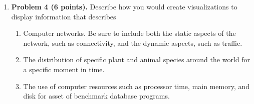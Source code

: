\documentclass{article}%
\newenvironment{proof}[1][Proof]{\textbf{#1.} }{\ \rule{0.5em}{0.5em}}
\begin{document}
\begin{enumerate}
\begin{proof}
\begin{enumerate}
\item \textbf{Triangle Inequality.} \\
$ D(A,C) \leq D(A,B) + D(B,C) $ for all set $A,B,$ and $C$. \\
By De Morgan, $D(A,B) = size(A-B) + size(B-A) = size(A) + size(B) - 2size(A \bigcap B) $ \\
 $D(B,C) = size(B-C) + size(C-B) = size(B) + size(C) - 2size(B \bigcap C) $ \\
 $D(A,C) = size(A-C) + size(C-A) = size(A) + size(C) - 2size(A \bigcap C) $.\\
 $D(A,B) + D(B,C) - D(A,C)=size(A) + size(B) - 2size(A \bigcap B) + size(B) + size(C) - 2size(B \bigcap C)  - size(A) - size(C) + 2size(A \bigcap C)  $ \\
 $\Rightarrow D(A,B) + D(B,C) - D(A,C)= 2size(B) - 2size(A \bigcap B) - 2size(B \bigcap C) + 2size(A \bigcap C)  $ \\
 By De Morgan, $size(B) + size(A \bigcap B \bigcap C) \geq size(A \bigcap B) + size(B \bigcap C) $. \\
 Since $size(A \bigcap C)  \geq  size(A \bigcap B \bigcap C) $, $size(B) + size(A \bigcap C) \geq size(A \bigcap B) + size(B \bigcap C) $.\\
 $\Rightarrow 2size(B) - 2size(A \bigcap B) - 2size(B \bigcap C) + 2size(A \bigcap C)  \geq 0$ \\
 $\Rightarrow D(A,B) + D(B,C) - D(A,C) \geq 0 \Rightarrow D(A,C) \leq D(A,B) + D(B,C) $\\
 Thus, $ D(A,C) \leq D(A,B) + D(B,C) $ for all set $A,B,$ and $C$.
\end{enumerate}
 Since all these three properties hold for $D(A,B) := size(A-B) + size(B-A)$, $D(A,B)$ satisfies the metric axioms.
 
 \end{proof}
 


\item \textbf{Problem 4 (6 points).} Describe how you would create visualizations to display information that describes
 \begin{enumerate}
		\item Computer networks. Be sure to include both the static aspects of the network, such as connectivity, and the dynamic aspects, such as traffic. 		
		\item The distribution of specific plant and animal species around the world for a specific moment in time.
		\item The use of computer resources such as processor time, main memory, and disk for asset of benchmark database programs.
 \end{enumerate}
 

\end{enumerate}
\end{document}
